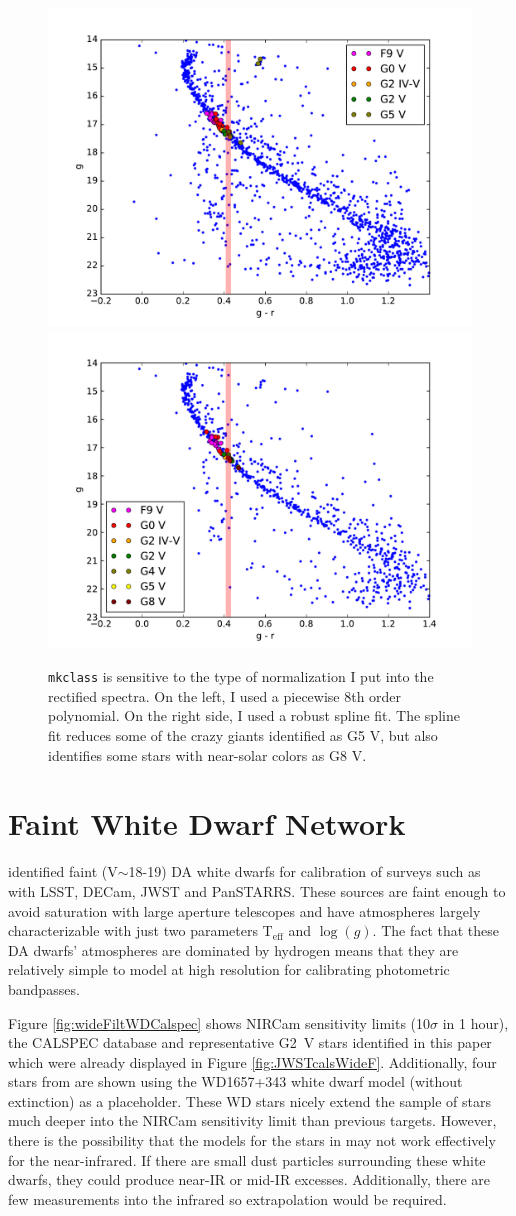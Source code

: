\documentclass{aastex6}
\begin{document}
\begin{figure}[!hbtp]
\centering
\includegraphics[width=.49\columnwidth]{colormag_two_runs.pdf}
\includegraphics[width=.49\columnwidth]{images/colormagNGC_2420_spline_rect.pdf}
\caption{\texttt{mkclass} is sensitive to the type of normalization I put into the rectified spectra. On the left, I used a piecewise 8th order polynomial. On the right side, I used a robust spline fit.
The spline fit reduces some of the crazy giants identified as G5 V, but also identifies some stars with near-solar colors as G8 V.}\label{fig:splineVsPiecewiseCM}
\end{figure}

\clearpage

\section{Faint White Dwarf Network}
\citet{narayan2016wdnetwork} identified faint (V$\sim$18-19) DA white dwarfs for calibration of surveys such as with LSST, DECam, JWST and PanSTARRS.
These sources are faint enough to avoid saturation with large aperture telescopes and have atmospheres largely characterizable with just two parameters T$_\mathrm{eff}$ and $\log(g)$.
The fact that these DA dwarfs' atmospheres are dominated by hydrogen means that they are relatively simple to model at high resolution for calibrating photometric bandpasses.

Figure \ref{fig:wideFiltWDCalspec} shows NIRCam sensitivity limits (10$\sigma$ in 1 hour), the CALSPEC database and representative G2~V stars identified in this paper which were already displayed in Figure \ref{fig:JWSTcalsWideF}.
Additionally, four stars from \citet{narayan2016wdnetwork} are shown using the WD1657+343 white dwarf model (without extinction) as a placeholder.
These WD stars nicely extend the sample of stars much deeper into the NIRCam sensitivity limit than previous targets.
However, there is the possibility that the models for the stars in \citet{narayan2016wdnetwork} may not work effectively for the near-infrared.
If there are small dust particles surrounding these white dwarfs, they could produce near-IR or mid-IR excesses.
Additionally, there are few measurements into the infrared so extrapolation would be required.
\end{document}
